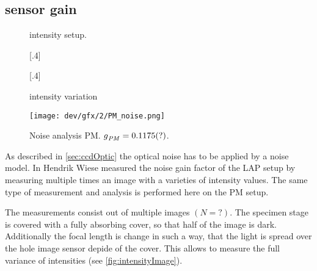 \subsection{sensor gain}\label{sec:sensorGain}
%
\begin{figure}[!t]
\centering
\def\tikzwidth{0.75\textwidth}
\caption[intensity setup]{intensity setup. }
\label{fig:intensityFocus}
\end{figure}
% 
\begin{figure}[!t]
\centering
% 
[.4\textwidth]{
% 
}
% 
[.4\textwidth]{
}
% 
\caption[intensity image]{intensity variation}
\label{fig:intensityMeasurement}
\end{figure}
% 
% 
\begin{figure}[!t]
\centering
\texttt{[image: dev/gfx/2/PM\_noise.png]}
\caption[Noise analysis]{Noise analysis PM. $\textnormal{$g$}_{\mathit{PM}} = \SI{0.1175}{}(?)$. }
\label{fig:parameterModelSimGain}
\end{figure}
% 
As described in \cref{sec:ccdOptic} the optical noise has to be applied by a noise model.
In \cite{Wiese:887678} Hendrik Wiese measured the noise gain factor of the \ac{LAP} setup by measuring multiple times an image with a varieties of intensity values.
The same type of measurement and analysis is performed here on the \ac{PM} setup.

The measurements consist out of multiple images $(N=?)$. The specimen stage is covered with a fully absorbing cover, so that half of the image is dark.
Additionally the focal length is change in such a way, that the light is spread over the hole image sensor depide of the cover.
This allows to measure the full variance of intensities (see \cref{fig:intensityImage}).

